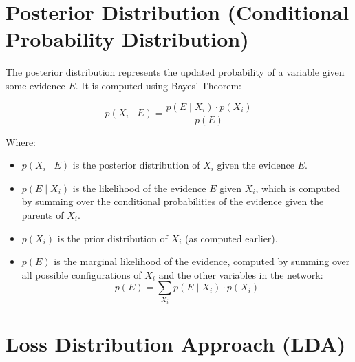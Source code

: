 \section*{Posterior Distribution (Conditional Probability Distribution)}

The posterior distribution represents the updated probability of a variable given some evidence \( E \). It is computed using Bayes' Theorem:

\begin{equation}
p(X_i \mid E) = \frac{p(E \mid X_i) \cdot p(X_i)}{p(E)}
\end{equation}

Where:
\begin{itemize}
    \item \( p(X_i \mid E) \) is the posterior distribution of \( X_i \) given the evidence \( E \).
    \item \( p(E \mid X_i) \) is the likelihood of the evidence \( E \) given \( X_i \), which is computed by summing over the conditional probabilities of the evidence given the parents of \( X_i \).
    \item \( p(X_i) \) is the prior distribution of \( X_i \) (as computed earlier).
    \item \( p(E) \) is the marginal likelihood of the evidence, computed by summing over all possible configurations of \( X_i \) and the other variables in the network:
    \begin{equation} 
    p(E) = \sum_{X_i} p(E \mid X_i) \cdot p(X_i)
    \end{equation}
\end{itemize}

\section*{Loss Distribution Approach (LDA)}


